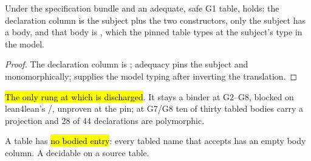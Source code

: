 \begin{lemma}\label{lem:Green-g1_compilerBodies}
 \leanok
{}
Under the specification bundle and an adequate, safe G1 table,  holds: the
declaration column is the subject plus the two  constructors, only the subject has a body,
and that body is , which the pinned table types at the subject's type in the model.
\end{lemma}

\begin{proof} \leanok
{}
 The declaration column is ; adequacy pins the subject and 
monomorphically;  supplies the model typing after inverting the translation.
\end{proof}

\begin{remark}
 \hl{The only rung at which  is discharged}. It stays a binder at G2--G8,
blocked on lean4lean's /, unproven at the pin; at G7/G8
ten of thirty tabled bodies carry a projection and 28 of 44 declarations are polymorphic.
\end{remark}

\begin{definition}\label{def:Green-NoTabledCasesOnBody}
 \leanok
{}
 A table has \hl{no bodied  entry}: every tabled name that
 accepts has an empty body column.
 A decidable  on a source table.
\end{definition}

